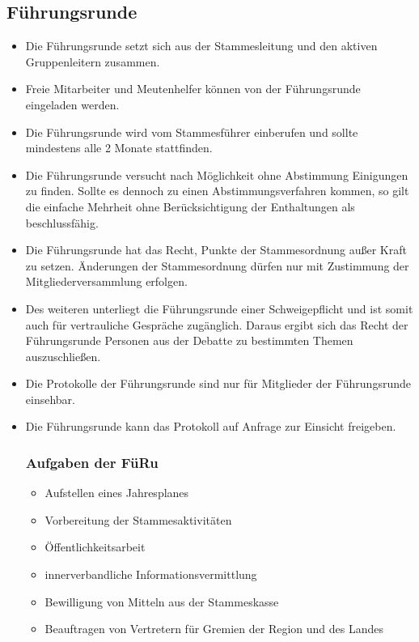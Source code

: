 \documentclass[a4paper]{article}
\begin{document}
    \subsection{Führungsrunde} %
    \label{sub:fuhrungsrunde}
	\begin{itemize}
		\item Die Führungsrunde setzt sich aus der Stammesleitung und den aktiven Gruppenleitern zusammen. 
		\item Freie Mitarbeiter und Meutenhelfer können von der Führungsrunde eingeladen werden. 
		\item Die Führungsrunde wird vom Stammesführer einberufen und sollte mindestens alle 2 Monate stattfinden. 
		\item Die Führungsrunde versucht nach Möglichkeit ohne Abstimmung Einigungen zu finden. Sollte es dennoch zu einen Abstimmungsverfahren kommen, so gilt die einfache Mehrheit ohne Berücksichtigung der Enthaltungen als beschlussfähig. 
		\item Die Führungsrunde hat das Recht, Punkte der Stammesordnung außer Kraft zu setzen. Änderungen der Stammesordnung dürfen nur mit Zustimmung der Mitgliederversammlung erfolgen. 
		\item Des weiteren unterliegt die Führungsrunde einer Schweigepflicht und ist somit auch für vertrauliche Gespräche zugänglich. Daraus ergibt sich das Recht der Führungsrunde Personen aus der Debatte zu bestimmten Themen auszuschließen. 
		\item Die Protokolle der Führungsrunde sind nur für Mitglieder der Führungsrunde einsehbar.
        \item Die Führungsrunde kann das Protokoll auf Anfrage zur Einsicht freigeben.
		\subsubsection{Aufgaben der FüRu} %
		\label{ssub:aufgaben_der_furu}
		\begin{itemize}
		    \item Aufstellen eines Jahresplanes 
			\item Vorbereitung der Stammesaktivitäten 
			\item Öffentlichkeitsarbeit 
			\item innerverbandliche Informationsvermittlung 
			\item Bewilligung von Mitteln aus der Stammeskasse 
			\item Beauftragen von Vertretern für Gremien der Region und des Landes 
		\end{itemize}
	\end{itemize}
    
\end{document}
